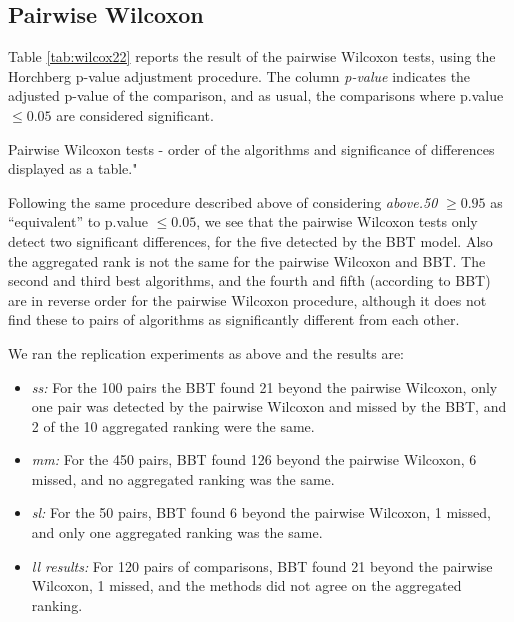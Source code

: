 \documentclass[twoside,11pt,preprint]{article}
\begin{document}
\hypertarget{pairwise-wilcoxon}{%
\subsection{\texorpdfstring{Pairwise Wilcoxon \label{sec:comp-wil}}{Pairwise Wilcoxon }}\label{pairwise-wilcoxon}}

Table \ref{tab:wilcox22} reports the result of the pairwise Wilcoxon
tests, using the Horchberg p-value adjustment procedure. The column
{\em p-value} indicates the adjusted p-value of the comparison, and as
usual, the comparisons where p.value \(\le 0.05\) are considered
significant.

\begin{table}[ht]
\centering
{}\quad
{}
\caption{Pairwise Wilcoxon tests - order of the algorithms and significance of differences displayed as a table."}
\label{tab:wilcox22}
\end{table}

Following the same procedure described above of considering
{\em above.50} \(\ge 0.95\) as ``equivalent'' to p.value \(\le 0.05\), we
see that the pairwise Wilcoxon tests only detect two significant
differences, for the five detected by the BBT model. Also the
aggregated rank is not the same for the pairwise Wilcoxon and BBT. The
second and third best algorithms, and the fourth and fifth (according
to BBT) are in reverse order for the pairwise Wilcoxon procedure,
although it does not find these to pairs of algorithms as
significantly different from each other.

We ran the replication experiments as above and
the results are:

\begin{itemize}
\item
  \emph{ss:} For the 100 pairs the BBT found 21 beyond the pairwise
  Wilcoxon, only one pair was detected by the pairwise Wilcoxon and
  missed by the BBT, and 2 of the 10 aggregated ranking were the
  same.
\item
  \emph{mm:} For the 450 pairs, BBT found 126 beyond the pairwise
  Wilcoxon, 6 missed, and no aggregated ranking was the same.
\item
  \emph{sl:} For the 50 pairs, BBT found 6 beyond the pairwise Wilcoxon,
  1 missed, and only one aggregated ranking was the same.
\item
  \emph{ll results:} For 120 pairs of comparisons, BBT found 21 beyond
  the pairwise Wilcoxon, 1 missed, and the methods did not agree on
  the aggregated ranking.
\end{itemize}
\end{document}
